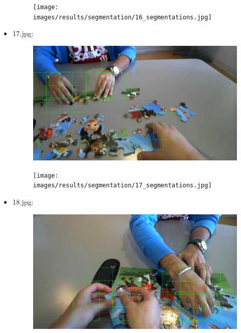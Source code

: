 \begin{itemize}
\begin{figure}[!htb]
\begin{minipage}{0.5\textwidth}
            \end{minipage}\hfill
            \begin{minipage}{0.5\textwidth}
                \centering
                \texttt{[image: images/results/segmentation/16\_segmentations.jpg]}
            \end{minipage}
        \end{figure}
    \item 17.jpg:
        \begin{figure}[!htb]
            \begin{minipage}{0.5\textwidth}
                \centering
                \includegraphics[scale = 0.205]{images/results/detection/17_detections.jpg}
            \end{minipage}\hfill
            \begin{minipage}{0.5\textwidth}
                \centering
                \texttt{[image: images/results/segmentation/17\_segmentations.jpg]}
            \end{minipage}
        \end{figure}
    \newpage
    \item 18.jpg:
        \begin{figure}[!htb]
            \begin{minipage}{0.5\textwidth}
                \centering
                \includegraphics[scale = 0.205]{images/results/detection/18_detections.jpg}

\end{minipage}
\end{figure}
\end{itemize}
